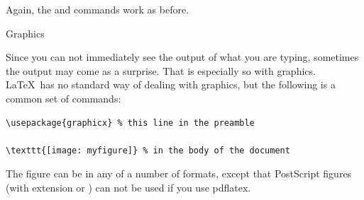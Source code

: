 {Again, the \n{\\label} and \n{\\ref} commands work as before.}{}

 {Graphics}

Since you can not immediately see the output of what you are typing,
sometimes the output may come as a surprise. That is especially so
with graphics. \LaTeX\ has no standard way of dealing with graphics,
but the following is a common set of commands:
\begin{verbatim}
\usepackage{graphicx} % this line in the preamble

\texttt{[image: myfigure]} % in the body of the document
\end{verbatim}
The figure can be in any of a number of formats, except that
PostScript figures (with extension  or )
can not be used if you use pdflatex.

